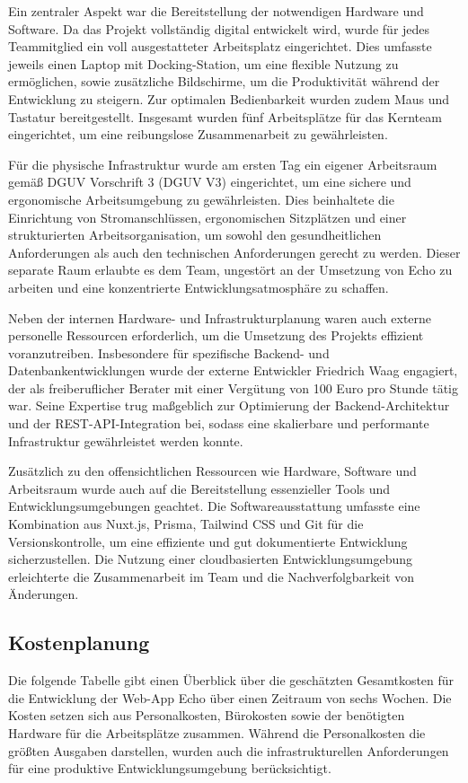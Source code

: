\documentclass[a4paper,12pt]{article}
\begin{document}
Ein zentraler Aspekt war die Bereitstellung der notwendigen Hardware und
Software. Da das Projekt vollständig digital entwickelt wird, wurde für jedes
Teammitglied ein voll ausgestatteter Arbeitsplatz eingerichtet. Dies umfasste
jeweils einen Laptop mit Docking-Station, um eine flexible Nutzung zu
ermöglichen, sowie zusätzliche Bildschirme, um die Produktivität während der
Entwicklung zu steigern. Zur optimalen Bedienbarkeit wurden zudem Maus und
Tastatur bereitgestellt. Insgesamt wurden fünf Arbeitsplätze für das Kernteam
eingerichtet, um eine reibungslose Zusammenarbeit zu gewährleisten.

Für die physische Infrastruktur wurde am ersten Tag ein eigener Arbeitsraum
gemäß DGUV Vorschrift 3 (DGUV V3) eingerichtet, um eine sichere und
ergonomische Arbeitsumgebung zu gewährleisten. Dies beinhaltete die Einrichtung
von Stromanschlüssen, ergonomischen Sitzplätzen und einer strukturierten
Arbeitsorganisation, um sowohl den gesundheitlichen Anforderungen als auch den
technischen Anforderungen gerecht zu werden. Dieser separate Raum erlaubte es
dem Team, ungestört an der Umsetzung von Echo zu arbeiten und eine
konzentrierte Entwicklungsatmosphäre zu schaffen.

Neben der internen Hardware- und Infrastrukturplanung waren auch externe
personelle Ressourcen erforderlich, um die Umsetzung des Projekts effizient
voranzutreiben. Insbesondere für spezifische Backend- und
Datenbankentwicklungen wurde der externe Entwickler Friedrich Waag engagiert,
der als freiberuflicher Berater mit einer Vergütung von 100 Euro pro Stunde
tätig war. Seine Expertise trug maßgeblich zur Optimierung der
Backend-Architektur und der REST-API-Integration bei, sodass eine skalierbare
und performante Infrastruktur gewährleistet werden konnte.

Zusätzlich zu den offensichtlichen Ressourcen wie Hardware, Software und
Arbeitsraum wurde auch auf die Bereitstellung essenzieller Tools und
Entwicklungsumgebungen geachtet. Die Softwareausstattung umfasste eine
Kombination aus Nuxt.js, Prisma, Tailwind CSS und Git für die
Versionskontrolle, um eine effiziente und gut dokumentierte Entwicklung
sicherzustellen. Die Nutzung einer cloudbasierten Entwicklungsumgebung
erleichterte die Zusammenarbeit im Team und die Nachverfolgbarkeit von
Änderungen.

\subsection{Kostenplanung}
Die folgende Tabelle gibt einen Überblick über die
geschätzten Gesamtkosten für die Entwicklung der Web-App Echo über einen
Zeitraum von sechs Wochen. Die Kosten setzen sich aus Personalkosten,
Bürokosten sowie der benötigten Hardware für die Arbeitsplätze zusammen.
Während die Personalkosten die größten Ausgaben darstellen, wurden auch die
infrastrukturellen Anforderungen für eine produktive Entwicklungsumgebung
berücksichtigt.
\end{document}
